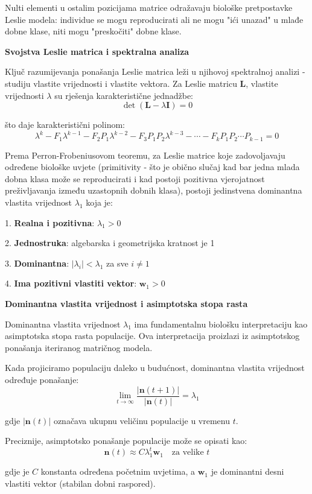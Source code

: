 \documentclass[11pt,oneside]{book}
\begin{document}
Nulti elementi u ostalim pozicijama matrice odražavaju biološke pretpostavke Leslie modela: individue se mogu reproducirati ali ne mogu "ići unazad" u mlađe dobne klase, niti mogu "preskočiti" dobne klase.

\textbf{Svojstva Leslie matrica i spektralna analiza}

Ključ razumijevanja ponašanja Leslie matrica leži u njihovoj spektralnoj analizi - studiju vlastite vrijednosti i vlastite vektora. Za Leslie matricu $\mathbf{L}$, vlastite vrijednosti $\lambda$ su rješenja karakteristične jednadžbe:
$$\det(\mathbf{L} - \lambda \mathbf{I}) = 0$$

što daje karakteristični polinom:
$$\lambda^k - F_1\lambda^{k-1} - F_2P_1\lambda^{k-2} - F_3P_1P_2\lambda^{k-3} - \cdots - F_kP_1P_2\cdots P_{k-1} = 0$$

Prema Perron-Frobeniusovom teoremu, za Leslie matrice koje zadovoljavaju određene biološke uvjete (primitivity - što je obično slučaj kad bar jedna mlada dobna klasa može se reproducirati i kad postoji pozitivna vjerojatnost preživljavanja između uzastopnih dobnih klasa), postoji jedinstvena dominantna vlastita vrijednost $\lambda_1$ koja je:

1. \textbf{Realna i pozitivna}: $\lambda_1 > 0$  

2. \textbf{Jednostruka}: algebarska i geometrijska kratnost je 1  

3. \textbf{Dominantna}: $|\lambda_i| < \lambda_1$ za sve $i \neq 1$  

4. \textbf{Ima pozitivni vlastiti vektor}: $\mathbf{w}_1 > 0$    


\textbf{Dominantna vlastita vrijednost i asimptotska stopa rasta}

Dominantna vlastita vrijednost $\lambda_1$ ima fundamentalnu biološku interpretaciju kao asimptotska stopa rasta populacije. Ova interpretacija proizlazi iz asimptotskog ponašanja iteriranog matričnog modela.

Kada projiciramo populaciju daleko u budućnost, dominantna vlastita vrijednost određuje ponašanje:
$$\lim_{t \to \infty} \frac{|\mathbf{n}(t+1)|}{|\mathbf{n}(t)|} = \lambda_1$$

gdje $|\mathbf{n}(t)|$ označava ukupnu veličinu populacije u vremenu $t$.

Preciznije, asimptotsko ponašanje populacije može se opisati kao:
$$\mathbf{n}(t) \approx C\lambda_1^t \mathbf{w}_1 \quad \text{za velike } t$$

gdje je $C$ konstanta određena početnim uvjetima, a $\mathbf{w}_1$ je dominantni desni vlastiti vektor (stabilan dobni raspored).
\end{document}
